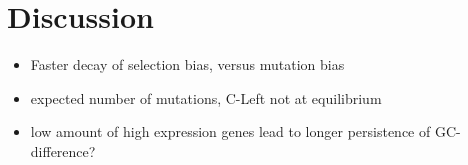 \documentclass[12pt,draft]{article}
\begin{document}
\section*{Discussion}

\begin{itemize}
	\item Faster decay of selection bias, versus mutation bias
	\item expected number of mutations, C-Left not at equilibrium
	\item low amount of high expression genes lead to longer persistence of GC-difference?
\end{itemize}
\end{document}
